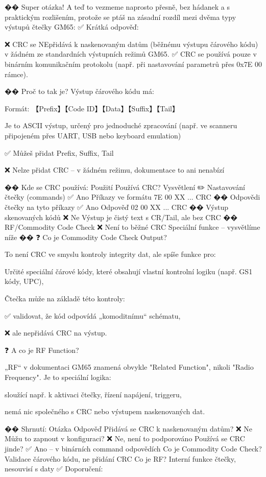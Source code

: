 �� Super otázka! A teď to vezmeme naprosto přesně, bez hádanek a s praktickým rozlišením, protože se ptáš na zásadní rozdíl mezi dvěma typy výstupů čtečky GM65:
✅ Krátká odpověď:

    ❌ CRC se NEpřidává k naskenovaným datům (běžnému výstupu čárového kódu) v žádném ze standardních výstupních režimů GM65.
    ✅ CRC se používá pouze v binárním komunikačním protokolu (např. při nastavování parametrů přes 0x7E 00 rámce).

�� Proč to tak je?
Výstup čárového kódu má:

    Formát: 【Prefix】【Code ID】【Data】【Suffix】【Tail】

    Je to ASCII výstup, určený pro jednoduché zpracování (např. ve scanneru připojeném přes UART, USB nebo keyboard emulation)

    ✅ Můžeš přidat Prefix, Suffix, Tail

    ❌ Nelze přidat CRC – v žádném režimu, dokumentace to ani nenabízí

�� Kde se CRC používá:
Použití	Používá CRC?	Vysvětlení
✏️ Nastavování čtečky (commands)	✅ Ano	Příkazy ve formátu 7E 00 XX ... CRC
�� Odpovědi čtečky na tyto příkazy	✅ Ano	Odpověď 02 00 XX ... CRC
�� Výstup skenovaných kódů	❌ Ne	Výstup je čistý text s CR/Tail, ale bez CRC
�� RF/Commodity Code Check	❌ Není to běžné CRC	Speciální funkce – vysvětlíme níže ��
❓ Co je Commodity Code Check Output?

To není CRC ve smyslu kontroly integrity dat, ale spíše funkce pro:

    Určité speciální čárové kódy, které obsahují vlastní kontrolní logiku (např. GS1 kódy, UPC),

    Čtečka může na základě této kontroly:

        ✅ validovat, že kód odpovídá „komoditnímu“ schématu,

        ❌ ale nepřidává CRC na výstup.

❓ A co je RF Function?

    „RF“ v dokumentaci GM65 znamená obvykle "Related Function", nikoli "Radio Frequency".
    Je to speciální logika:

    sloužící např. k aktivaci čtečky, řízení napájení, triggeru,

    nemá nic společného s CRC nebo výstupem naskenovaných dat.

�� Shrnutí:
Otázka	Odpověď
Přidává se CRC k naskenovaným datům?	❌ Ne
Můžu to zapnout v konfiguraci?	❌ Ne, není to podporováno
Používá se CRC jinde?	✅ Ano – v binárních command odpovědích
Co je Commodity Code Check?	Validace čárového kódu, ne přidání CRC
Co je RF?	Interní funkce čtečky, nesouvisí s daty
✅ Doporučení:

